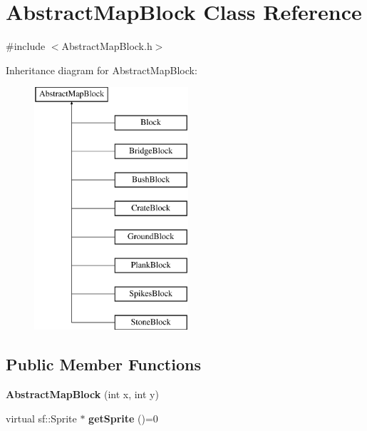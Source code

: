 \hypertarget{class_abstract_map_block}{}\section{Abstract\+Map\+Block Class Reference}
\label{class_abstract_map_block}


{\ttfamily \#include $<$Abstract\+Map\+Block.\+h$>$}

Inheritance diagram for Abstract\+Map\+Block\+:\begin{figure}[H]
\begin{center}
\leavevmode
\includegraphics[height=9.000000cm]{class_abstract_map_block}
\end{center}
\end{figure}
\subsection*{Public Member Functions}
\begin{DoxyCompactItemize}
\item 
\mbox{\label{class_abstract_map_block_afea0f904a49f56b417387f721c8677c9}} 
{\bfseries Abstract\+Map\+Block} (int x, int y)
\item 
\mbox{\label{class_abstract_map_block_ab5a448a1b6478d10a8814c6d19c4fdb4}} 
virtual sf\+::\+Sprite $\ast$ {\bfseries get\+Sprite} ()=0
\end{DoxyCompactItemize}
